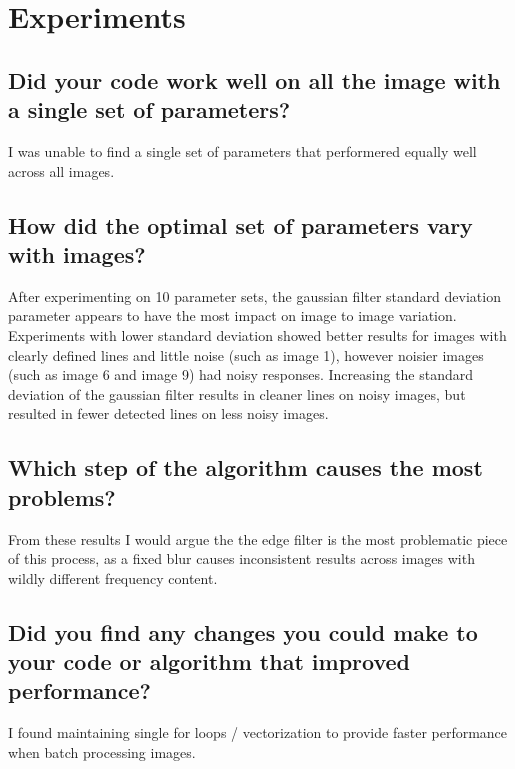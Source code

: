 \documentclass[12pt]{article}
\begin{document}
\subsection{}
\subsection{}
\subsection{}

\section{Experiments}
\subsection{Did your code work well on all the image with a single set of parameters? }
I was unable to find a single set of parameters that performered equally well across all images.

\subsection{How did the optimal set of parameters vary with images?}
After experimenting on 10 parameter sets, the gaussian filter standard deviation parameter appears to have the most impact on image to image variation. Experiments with lower standard deviation showed better results for images with clearly defined lines and little noise (such as image 1), however noisier images (such as image 6 and image 9) had noisy responses.
Increasing the standard deviation of the gaussian filter results in cleaner lines on noisy images, but resulted in fewer detected lines on less noisy images.

\subsection{Which step of the algorithm causes the most problems? }
From these results I would argue the the edge filter is the most problematic piece of this process, as a fixed blur causes inconsistent results across images with wildly different frequency content.

\subsection{Did you find any changes you could make to your code or algorithm that improved performance?}
I found maintaining single for loops / vectorization to provide faster performance when batch processing images.
\end{document}
